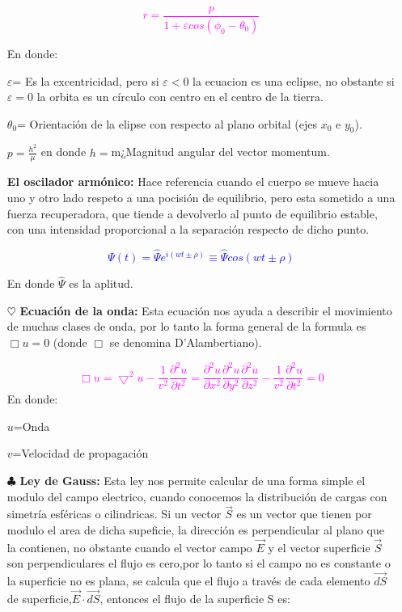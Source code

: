 \documentclass[letterpaper,12pt]{article}
\begin{document}
\begin{itemize}
      \textcolor{magenta}{$$r=\frac{p}{1+\varepsilon cos(\phi_0-\theta_0)}$$}
      
      En donde:
      
      $\varepsilon$= Es la excentricidad, pero si $\varepsilon<0 $ la ecuacion es una eclipse, no obstante si $\varepsilon=0$ la orbita es un círculo con centro en el centro de la tierra.
      
      $\theta_0$= Orientación de la elipse con respecto al plano orbital (ejes $x_0$ e $y_0$).
      
      $p=\frac{h^{2}}{\mu}$ en donde $h= $m¿Magnitud angular del vector momentum.
     
     \item[\textmusicalnote]{\textbf{El oscilador armónico:}}     Hace referencia cuando el cuerpo se mueve hacia uno y otro lado respeto a una pocisión de equilibrio, pero esta sometido a una fuerza recuperadora, que tiende a devolverlo al punto de equilibrio estable, con una intensidad proporcional a la separación respecto de dicho punto.
     
      \textcolor{blue}{$${\textbf{$\Psi$}}(t)=\hat{\Psi}e^{i(wt \pm \rho)}\equiv \hat{\Psi} cos (wt \pm \rho)$$}
      
    En donde $\hat{\Psi}$ es la aplitud.
     \item[$\heartsuit$]{\textbf {Ecuación de la onda:}} Esta ecuación nos ayuda a describir el movimiento de muchas clases de onda, por lo tanto la forma general de la formula es $\Box u=0$ (donde $\Box$ se denomina D'Alambertiano).
     
     \textcolor{magenta}{$$\Box u= \bigtriangledown^{2}u-\frac{1}{v^{2}}\frac{\partial^{2}u}{\partial t^{2}}=\frac{\partial^{2}u}{\partial x^{2}}\frac{\partial^{2}u}{\partial y^{2}}\frac{\partial^{2}u}{\partial z^{2}}-\frac{1}{v^{2}}\frac{\partial^{2}u}{\partial t^{2}}=0$$}
     En donde: 
     
     $u$=Onda
     
     $v$=Velocidad de propagación
     
     \item[$\clubsuit$]{\textbf {Ley de Gauss:}} Esta ley nos permite calcular de una forma simple el modulo del campo electrico, cuando conocemos la distribución de cargas con simetría esféricas o cilindricas.
     Si un vector $\vec{S}$ es un vector que tienen por modulo el area de dicha supeficie, la dirección es perpendicular al plano que la contienen, no obstante cuando el vector campo $\vec{E}$ y el vector superficie $\vec{S}$ son perpendiculares el flujo es cero,por lo tanto si el campo no es constante o la superficie no es plana, se calcula que el flujo a través de cada elemento $\vec{dS}$ de superficie,$\vec{E} \cdot \vec{dS}$, entonces el flujo de la superficie S es:
     

\end{itemize}
\end{document}
